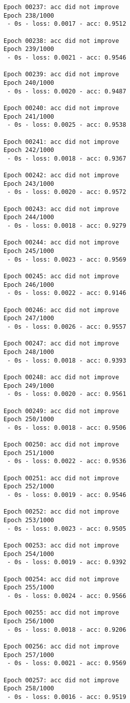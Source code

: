 \documentclass[11pt]{article}
\begin{document}
\begin{Verbatim}[commandchars=\\\{\}]
Epoch 00237: acc did not improve
Epoch 238/1000
 - 0s - loss: 0.0017 - acc: 0.9512

Epoch 00238: acc did not improve
Epoch 239/1000
 - 0s - loss: 0.0021 - acc: 0.9546

Epoch 00239: acc did not improve
Epoch 240/1000
 - 0s - loss: 0.0020 - acc: 0.9487

Epoch 00240: acc did not improve
Epoch 241/1000
 - 0s - loss: 0.0025 - acc: 0.9538

Epoch 00241: acc did not improve
Epoch 242/1000
 - 0s - loss: 0.0018 - acc: 0.9367

Epoch 00242: acc did not improve
Epoch 243/1000
 - 0s - loss: 0.0020 - acc: 0.9572

Epoch 00243: acc did not improve
Epoch 244/1000
 - 0s - loss: 0.0018 - acc: 0.9279

Epoch 00244: acc did not improve
Epoch 245/1000
 - 0s - loss: 0.0023 - acc: 0.9569

Epoch 00245: acc did not improve
Epoch 246/1000
 - 0s - loss: 0.0022 - acc: 0.9146

Epoch 00246: acc did not improve
Epoch 247/1000
 - 0s - loss: 0.0026 - acc: 0.9557

Epoch 00247: acc did not improve
Epoch 248/1000
 - 0s - loss: 0.0018 - acc: 0.9393

Epoch 00248: acc did not improve
Epoch 249/1000
 - 0s - loss: 0.0020 - acc: 0.9561

Epoch 00249: acc did not improve
Epoch 250/1000
 - 0s - loss: 0.0018 - acc: 0.9506

Epoch 00250: acc did not improve
Epoch 251/1000
 - 0s - loss: 0.0022 - acc: 0.9536

Epoch 00251: acc did not improve
Epoch 252/1000
 - 0s - loss: 0.0019 - acc: 0.9546

Epoch 00252: acc did not improve
Epoch 253/1000
 - 0s - loss: 0.0023 - acc: 0.9505

Epoch 00253: acc did not improve
Epoch 254/1000
 - 0s - loss: 0.0019 - acc: 0.9392

Epoch 00254: acc did not improve
Epoch 255/1000
 - 0s - loss: 0.0024 - acc: 0.9566

Epoch 00255: acc did not improve
Epoch 256/1000
 - 0s - loss: 0.0018 - acc: 0.9206

Epoch 00256: acc did not improve
Epoch 257/1000
 - 0s - loss: 0.0021 - acc: 0.9569

Epoch 00257: acc did not improve
Epoch 258/1000
 - 0s - loss: 0.0016 - acc: 0.9519


\end{Verbatim}
\end{document}
